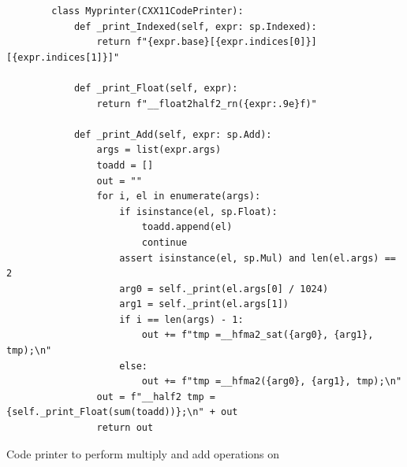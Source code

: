 \begin{listing}[H]
    \begin{verbatim}
        class Myprinter(CXX11CodePrinter):
            def _print_Indexed(self, expr: sp.Indexed):
                return f"{expr.base}[{expr.indices[0]}][{expr.indices[1]}]"

            def _print_Float(self, expr):
                return f"__float2half2_rn({expr:.9e}f)"

            def _print_Add(self, expr: sp.Add):
                args = list(expr.args)
                toadd = []
                out = ""
                for i, el in enumerate(args):
                    if isinstance(el, sp.Float):
                        toadd.append(el)
                        continue
                    assert isinstance(el, sp.Mul) and len(el.args) == 2
                    arg0 = self._print(el.args[0] / 1024)
                    arg1 = self._print(el.args[1])
                    if i == len(args) - 1:
                        out += f"tmp =__hfma2_sat({arg0}, {arg1}, tmp);\n"
                    else:
                        out += f"tmp =__hfma2({arg0}, {arg1}, tmp);\n"
                out = f"__half2 tmp = {self._print_Float(sum(toadd))};\n" + out
                return out
        \end{verbatim}
    \caption{Code printer to perform multiply and add operations on \halftwo}
\end{listing}

